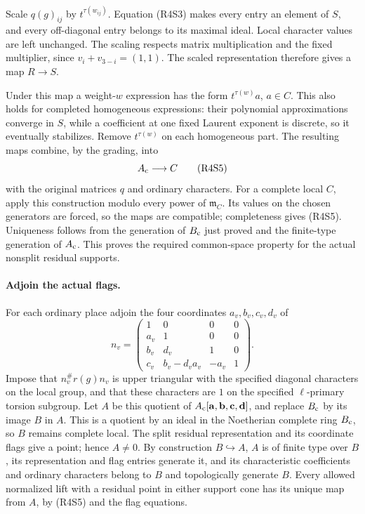 Scale \(q(g)_{ij}\) by \(t^{\tau(w_{ij})}\).
Equation (R4S3) makes every entry an element of \(S\),
and every off-diagonal entry belongs to its maximal ideal.
Local character values are left unchanged.
The scaling respects matrix multiplication and the fixed
multiplier, since
\(v_i+v_{3-i}=(1,1)\).
The scaled representation therefore gives a map \(R\to S\).

Under this map a weight-\(w\) expression has the form
\(t^{\tau(w)}a\), \(a\in C\).
This also holds for completed homogeneous expressions:
their polynomial approximations converge in \(S\), while
a coefficient at one fixed Laurent exponent is discrete,
so it eventually stabilizes.
Remove \(t^{\tau(w)}\) on each homogeneous part.
The resulting maps combine, by the grading, into
\[
                          A_{\rm c}\longrightarrow C
                                                        \tag{R4S5}
\]
with the original matrices \(q\) and ordinary characters.
For a complete local \(C\), apply this construction modulo
every power of \(\mathfrak m_C\).
Its values on the chosen generators are forced, so the maps
are compatible; completeness gives (R4S5).
Uniqueness follows from the generation of \(B_{\rm c}\)
just proved and the finite-type generation of \(A_{\rm c}\).
This proves the required common-space property for the
actual nonsplit residual supports.

\paragraph{Adjoin the actual flags.}
For each ordinary place adjoin the four coordinates
\(a_v,b_v,c_v,d_v\) of
\[
 n_v=
 \begin{pmatrix}
 1&0&0&0\\a_v&1&0&0\\b_v&d_v&1&0\\
 c_v&b_v-d_va_v&-a_v&1
 \end{pmatrix}.
\]
Impose that \(n_v^\#r(g)n_v\) is upper triangular with
the specified diagonal characters on the local group,
and that these characters are \(1\) on the specified
\(\ell\)-primary torsion subgroup.
Let \(A\) be this quotient of
\(A_{\rm c}[\mathbf a,\mathbf b,\mathbf c,\mathbf d]\),
and replace \(B_{\rm c}\) by its image \(B\) in \(A\).
This is a quotient by an ideal in the Noetherian complete
ring \(B_{\rm c}\), so \(B\) remains complete local.
The split residual representation and its coordinate flags
give a point; hence \(A\ne0\).
By construction \(B\hookrightarrow A\), \(A\) is of finite
type over \(B\), its representation and flag entries
generate it, and its characteristic coefficients and
ordinary characters belong to \(B\) and topologically
generate \(B\).
Every allowed normalized lift with a residual point in
either support cone has its unique map from \(A\), by
(R4S5) and the flag equations.

